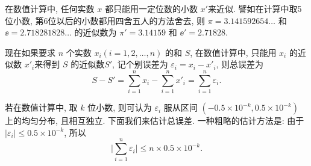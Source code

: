 \begin{example}[数值计算中的误差分析]\label{exam:4.4.4}
    在数值计算中, 任何实数 $x$ 都只能用一定位数的小数 $x'$来近似.
    譬如在计算中取5位小数, 第6位以后的小数都用四舍五人的方法舍去, 则 $ \pi = 3.141592654\dots $ 和 $ \ee = 2.718281828\dots $ 的近似数为 $\pi' = 3.14159 $ 和 $ \ee' = 2.71828 $.

    现在如果要求 $ n $ 个实数 $ x_i (i = 1, 2, \dotsc, n) $ 的和 $ S $, 在数值计算中, 只能用 $x_i$ 的近似数 $ x'_i $来得到 $ S $ 的近似数$ S' $, 记个别误差为 $ \varepsilon_i = x_i - x'_i $, 则总误差为
    \begin{equation*}
        S - S' = \sum_{i=1}^n x_i - \sum_{i=1}^n x'_i = \sum_{i=1}^n \varepsilon_i.
    \end{equation*}

    若在数值计算中, 取 $ k $ 位小数, 则可认为 $ \varepsilon_i $ 服从区间 $ ( -0.5\times 10^{-k}, 0.5\times 10^{-k} ) $ 上的均匀分布, 且相互独立.
    下面我们来估计总误差.
    一种粗略的估计方法是: 由于 $ \lvert \varepsilon_i \rvert \leq 0.5 \times 10^{-k} $, 所以
    \begin{equation}
        \biggl\lvert \sum_{i=1}^n \varepsilon_i \biggr\rvert \leq n \times 0.5 \times 10^{-k}.
    \end{equation}


\end{example}
